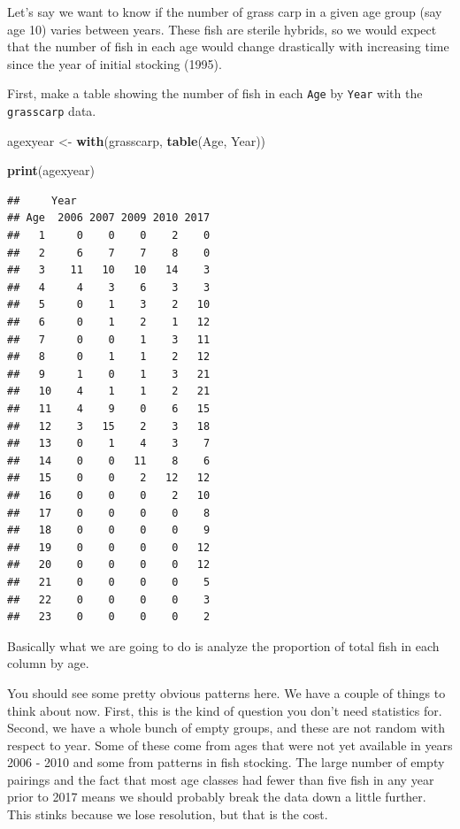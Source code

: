 \documentclass[
]{book}
\newenvironment{Shaded}{\begin{snugshade}}{\end{snugshade}}
\newcommand{\KeywordTok}[1]{\textcolor[rgb]{0.13,0.29,0.53}{\textbf{#1}}}
\newcommand{\NormalTok}[1]{#1}
\newcommand{\StringTok}[1]{\textcolor[rgb]{0.31,0.60,0.02}{#1}}
\begin{document}
Let's say we want to know if the number of grass carp in a given age group (say age 10) varies between years. These fish are sterile hybrids, so we would expect that the number of fish in each age would change drastically with increasing time since the year of initial stocking (1995).

First, make a table showing the number of fish in each \texttt{Age} by \texttt{Year} with the \texttt{grasscarp} data.

\begin{Shaded}
\begin{Highlighting}[]
\NormalTok{agexyear <-}\StringTok{ }\KeywordTok{with}\NormalTok{(grasscarp, }\KeywordTok{table}\NormalTok{(Age, Year))}

\KeywordTok{print}\NormalTok{(agexyear)}
\end{Highlighting}
\end{Shaded}

\begin{verbatim}
##     Year
## Age  2006 2007 2009 2010 2017
##   1     0    0    0    2    0
##   2     6    7    7    8    0
##   3    11   10   10   14    3
##   4     4    3    6    3    3
##   5     0    1    3    2   10
##   6     0    1    2    1   12
##   7     0    0    1    3   11
##   8     0    1    1    2   12
##   9     1    0    1    3   21
##   10    4    1    1    2   21
##   11    4    9    0    6   15
##   12    3   15    2    3   18
##   13    0    1    4    3    7
##   14    0    0   11    8    6
##   15    0    0    2   12   12
##   16    0    0    0    2   10
##   17    0    0    0    0    8
##   18    0    0    0    0    9
##   19    0    0    0    0   12
##   20    0    0    0    0   12
##   21    0    0    0    0    5
##   22    0    0    0    0    3
##   23    0    0    0    0    2
\end{verbatim}

Basically what we are going to do is analyze the proportion of total fish in each column by age.

You should see some pretty obvious patterns here. We have a couple of things to think about now. First, this is the kind of question you don't need statistics for. Second, we have a whole bunch of empty groups, and these are not random with respect to year. Some of these come from ages that were not yet available in years 2006 - 2010 and some from patterns in fish stocking. The large number of empty pairings and the fact that most age classes had fewer than five fish in any year prior to 2017 means we should probably break the data down a little further. This stinks because we lose resolution, but that is the cost.
\end{document}
